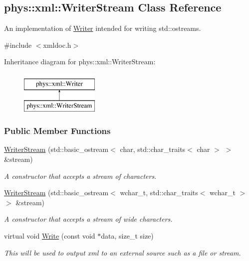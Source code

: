 \hypertarget{classphys_1_1xml_1_1WriterStream}{
\subsection{phys::xml::WriterStream Class Reference}
\label{d5/d6f/classphys_1_1xml_1_1WriterStream}
}


An implementation of \hyperlink{classphys_1_1xml_1_1Writer}{Writer} intended for writing std::ostreams.  




{\ttfamily \#include $<$xmldoc.h$>$}

Inheritance diagram for phys::xml::WriterStream:\begin{figure}[H]
\begin{center}
\leavevmode
\includegraphics[height=2.000000cm]{d5/d6f/classphys_1_1xml_1_1WriterStream}
\end{center}
\end{figure}
\subsubsection*{Public Member Functions}
\begin{DoxyCompactItemize}
\item 
\hyperlink{classphys_1_1xml_1_1WriterStream_ae170ab7c429b6f7149d3540243329dfa}{WriterStream} (std::basic\_\-ostream$<$ char, std::char\_\-traits$<$ char $>$ $>$ \&stream)
\begin{DoxyCompactList}\small\item\em A constructor that accepts a stream of characters. \item\end{DoxyCompactList}\item 
\hyperlink{classphys_1_1xml_1_1WriterStream_aaebcd545af8e44cf6556a46077f0a366}{WriterStream} (std::basic\_\-ostream$<$ wchar\_\-t, std::char\_\-traits$<$ wchar\_\-t $>$ $>$ \&stream)
\begin{DoxyCompactList}\small\item\em A constructor that accepts a stream of wide characters. \item\end{DoxyCompactList}\item 
virtual void \hyperlink{classphys_1_1xml_1_1WriterStream_a743c3f41a010df17f54054031fdc4891}{Write} (const void $\ast$data, size\_\-t size)
\begin{DoxyCompactList}\small\item\em This will be used to output xml to an external source such as a file or stream. \item\end{DoxyCompactList}\end{DoxyCompactItemize}


